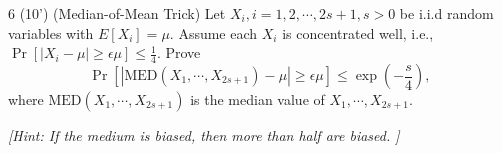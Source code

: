     \begin{question}{6 (10') (Median-of-Mean Trick)} 
    Let $X_i,i=1,2,\cdots,2s+1,s>0$ be i.i.d random variables with $E\left[X_i\right]=\mu$. 
    Assume each $X_i$ is concentrated well, i.e., $\Pr[|X_i-\mu|\geq \epsilon \mu]\leq \frac{1}{4}$. 
    Prove 
    $$
    \Pr[|\text{MED}(X_1,\cdots,X_{2s+1}) - \mu|\geq \epsilon\mu]\leq \exp\left(-\frac{s}{4}\right),
    $$ 
    where $\text{MED}(X_1,\cdots,X_{2s+1})$ is the median value of $X_1,\cdots,X_{2s+1}$.
    
    \textit{[Hint: If the medium is biased, then more than half are biased. ]}
    \end{question}